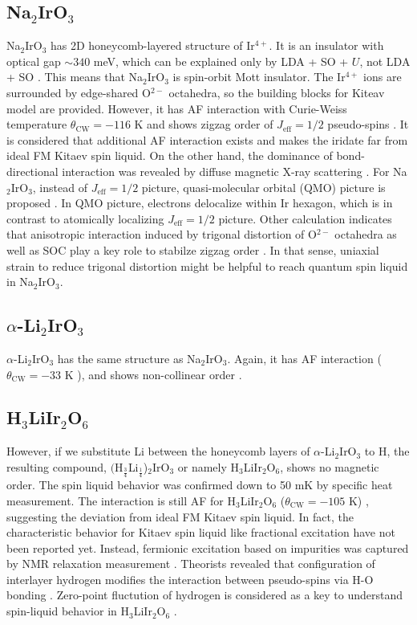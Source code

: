 \subsection{Na$_2$IrO$_3$}
Na$_2$IrO$_3$ has 2D honeycomb-layered structure of Ir$^{4+}$.
It is an insulator with optical gap $\sim 340$ meV, which can be explained only by LDA + SO + $U$, not LDA + SO \cite{comin20122}.
This means that Na$_2$IrO$_3$ is spin-orbit Mott insulator.
The Ir$^{4+}$ ions are surrounded by edge-shared O$^{2-}$ octahedra, so the building blocks for Kiteav model are provided.
However, it has AF interaction with Curie-Weiss temperature $\theta_{\mathrm{CW}} = - 116$ K \cite{singh2010antiferromagnetic}
and shows zigzag order of $J_{\mathrm{eff}} = 1/2$ pseudo-spins \cite{ye2012direct}.
It is considered that additional AF interaction exists and makes the iridate far from ideal FM Kitaev spin liquid.
On the other hand, the dominance of bond-directional interaction was revealed by diffuse magnetic X-ray scattering \cite{chun2015direct}.
For Na$_2$IrO$_3$, instead of $J_{\mathrm{eff}} = 1/2$ picture, quasi-molecular orbital (QMO) picture is proposed \cite{mazin20122}.
In QMO picture, electrons delocalize within Ir hexagon, which is in contrast to atomically localizing $J_{\mathrm{eff}} = 1/2$ picture.
Other calculation indicates that anisotropic interaction induced by trigonal distortion of O$^{2-}$ octahedra as well as SOC play a key role to stabilze zigzag order
\cite{yamaji2014first}.
In that sense, uniaxial strain to reduce trigonal distortion might be helpful to reach quantum spin liquid in Na$_2$IrO$_3$.

\subsection{$\alpha$-Li$_2$IrO$_3$}
$\alpha$-Li$_2$IrO$_3$ has the same structure as Na$_2$IrO$_3$.
Again, it has AF interaction ($\theta_{\mathrm{CW}} = - 33$ K \cite{singh2012relevance}),
and shows non-collinear order \cite{williams2016incommensurate}.

\subsection{H$_3$LiIr$_2$O$_6$}
However, if we substitute Li between the honeycomb layers of $\alpha$-Li$_2$IrO$_3$ to H,
the resulting compound, $($H$_{\frac{3}{4}}$Li$_{\frac{1}{4}}$)$_2$IrO$_3$
or namely H$_3$LiIr$_2$O$_6$, shows no magnetic order.
The spin liquid behavior was confirmed down to 50 mK by specific heat measurement.
The interaction is still AF for H$_3$LiIr$_2$O$_6$ ($\theta_{\mathrm{CW}} = -105$ K) \cite{kitagawa2018spin}, suggesting the deviation from ideal FM Kitaev spin liquid.
In fact, the characteristic behavior for Kitaev spin liquid like fractional excitation have not been reported yet.
Instead, fermionic excitation based on impurities was captured by NMR relaxation measurement \cite{kitagawa2018spin}.
Theorists revealed that configuration of interlayer hydrogen modifies the interaction between pseudo-spins via H-O bonding \cite{li2018role}.
Zero-point fluctution of hydrogen is considered as a key to understand spin-liquid behavior in H$_3$LiIr$_2$O$_6$ \cite{li2018role}.

